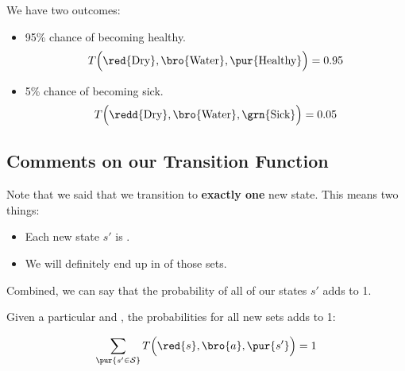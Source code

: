         We have two outcomes:

        \begin{itemize}
            \item 95\% chance of becoming healthy.
                \begin{equation}
                    T \Big( 
                        \text{\red{Dry}}, \text{\bro{Water}}, \text{\pur{Healthy}} 
                      \Big)
                   = 0.95
                \end{equation}

            \item 5\% chance of becoming sick.
                \begin{equation}
                    T \Big(
                        \text{\redd{Dry}}, \text{\bro{Water}}, \text{\grn{Sick}} 
                      \Big)
                    = 0.05
                \end{equation}
                
        \end{itemize}


    
    \phantom{}

    \subsection{Comments on our Transition Function}

        Note that we said that we transition to \textbf{exactly one} new state. This means two things:

        \begin{itemize}
            \item Each new state $s'$ is .
            \item We will definitely end up in  of those sets.
        \end{itemize}

        Combined, we can say that the probability of all of our states $s'$ adds to 1.\\

        \begin{concept}
            Given a particular  and , the probabilities for all new sets  adds to 1:

            \begin{equation*}
                \sum_{ \pur{s' \in \mathcal{S}} } T \Big(\red{s},\bro{a},\pur{s'} \Big) = 1
            \end{equation*}

            
        \end{concept}

